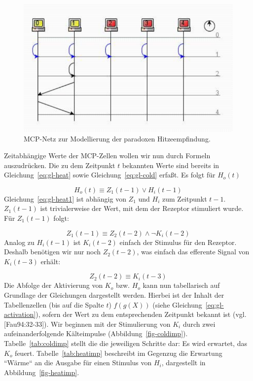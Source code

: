 \begin{figure}[h]
    \centering
    \includegraphics{images/p1ReadSeq.pdf}
    \caption{MCP-Netz zur Modellierung der paradoxen Hitzeempfindung.}
    \label{fig-mcpheat}
\end{figure}

\noindent
Zeitabhängige Werte der MCP-Zellen wollen wir nun durch Formeln auszudrücken.
Die zu dem Zeitpunkt $t$ bekannten Werte sind bereits in Gleichung~\ref{eq:gl-heat} sowie Gleichung~\ref{eq:gl-cold} erfaßt.
\noindent
Es folgt für $H_o(t)$

\begin{equation}
    H_o(t) \equiv Z_1(t-1) \lor H_i(t-1)
    \label{eq:gl-heat1}
\end{equation}
\noindent
Gleichung~\ref{eq:gl-heat1} ist abhängig von $Z_1$ und $H_i$ zum Zeitpunkt $t - 1$. $Z_1(t-1)$ ist trivialerweise der Wert, mit dem der Rezeptor stimuliert wurde. Für $Z_1(t-1)$ folgt:

\begin{equation}
    Z_1(t - 1) \equiv Z_2(t-2) \land \neg K_i(t-2)
    \label{eq:gl-z1}
\end{equation}
\noindent
Analog zu $H_i(t - 1)$ ist $K_i(t - 2)$ einfach der Stimulus für den Rezeptor.
Deshalb benötigen wir nur noch $Z_2(t-2)$, was einfach das efferente Signal von $K_i(t-3)$ erhält:

\begin{equation}
    Z_2(t-2) \equiv K_i(t-3)
    \label{eq:gl-z2}
\end{equation}
\noindent
Die Abfolge der Aktivierung von $K_o$ bzw. $H_o$ kann nun tabellarisch auf Grundlage der Gleichungen dargestellt werden.
Hierbei ist der Inhalt der Tabellenzellen (bis auf die Spalte $t$) $f(g(X))$  (siehe Gleichung~\ref{eq:gl-activation}), sofern der Wert zu dem entsprechenden Zeitpunkt bekannt ist (vgl. [Fau94:32-33]).
\noindent
Wir beginnen mit der Stimulierung von $K_i$ durch zwei aufeinanderfolgende Kälteimpulse (Abbildung~\ref{fig-coldimp}). Tabelle~\ref{tab:coldimp} stellt die die jeweiligen Schritte dar: Es wird erwartet, das $K_o$ feuert. Tabelle~\ref{tab:heatimp} beschreibt im Gegenzug die Erwartung ``Wärme`` an die Ausgabe für einen Stimulus von $H_i$, dargestellt in Abbildung~\ref{fig-heatimp}.

